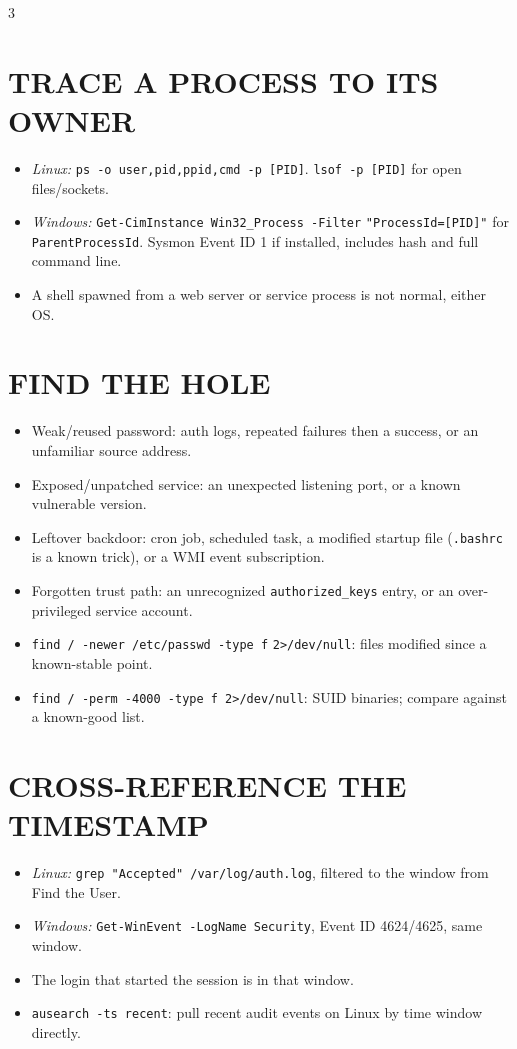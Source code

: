 \documentclass[7pt,landscape]{article}
\begin{document}
\begin{multicols*}{3}
\section{TRACE A PROCESS TO ITS OWNER}
\begin{itemize}
    \item \textit{\textcolor{linuxc}{Linux:}} \texttt{ps -o user,pid,ppid,cmd -p [PID]}. \texttt{lsof -p [PID]} for open files/sockets.
    \item \textit{\textcolor{winc}{Windows:}} \texttt{Get-CimInstance Win32\_Process -Filter} \newline \texttt{"ProcessId=[PID]"} for \texttt{ParentProcessId}. Sysmon Event ID 1 if installed, includes hash and full command line.
    \item A shell spawned from a web server or service process is not normal, either OS.
\end{itemize}

\section{FIND THE HOLE}
\begin{itemize}
    \item Weak/reused password: auth logs, repeated failures then a success, or an unfamiliar source address.
    \item Exposed/unpatched service: an unexpected listening port, or a known vulnerable version.
    \item Leftover backdoor: cron job, scheduled task, a modified startup file (\texttt{.bashrc} is a known trick), or a WMI event subscription.
    \item Forgotten trust path: an unrecognized \texttt{authorized\_keys} entry, or an over-privileged service account.
    \item \texttt{find / -newer /etc/passwd -type f} \newline \texttt{2>/dev/null}: files modified since a known-stable point.
    \item \texttt{find / -perm -4000 -type f 2>/dev/null}: SUID binaries; compare against a known-good list.
\end{itemize}

\section{CROSS-REFERENCE THE TIMESTAMP}
\begin{itemize}
    \item \textit{\textcolor{linuxc}{Linux:}} \texttt{grep "Accepted" /var/log/auth.log}, filtered to the window from Find the User.
    \item \textit{\textcolor{winc}{Windows:}} \texttt{Get-WinEvent -LogName Security}, Event ID 4624/4625, same window.
    \item The login that started the session is in that window.
    \item \texttt{ausearch -ts recent}: pull recent audit events on \textcolor{linuxc}{Linux} by time window directly.
\end{itemize}


\end{multicols*}
\end{document}
